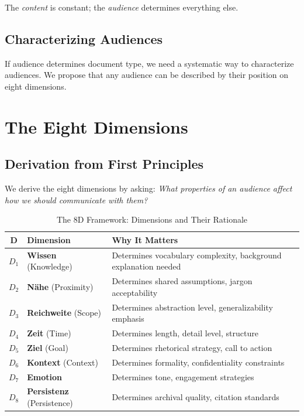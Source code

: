The \textit{content} is constant; the \textit{audience} determines everything else.

\subsection{Characterizing Audiences}

If audience determines document type, we need a systematic way to characterize
audiences. We propose that any audience can be described by their position
on eight dimensions.


\section{The Eight Dimensions}
\label{sec:doctype-theory-dimensions}

\subsection{Derivation from First Principles}

We derive the eight dimensions by asking: \textit{What properties of an audience
affect how we should communicate with them?}

\begin{table}[htbp]
\centering
\caption{The 8D Framework: Dimensions and Their Rationale}
\label{tab:8d-rationale}
\renewcommand{\arraystretch}{1.5}
\begin{tabular}{@{}clp{7cm}@{}}
\toprule
\textbf{D} & \textbf{Dimension} & \textbf{Why It Matters} \\
\midrule
$D_1$ & \textbf{Wissen} (Knowledge) &
Determines vocabulary complexity, background explanation needed \\
$D_2$ & \textbf{N\"ahe} (Proximity) &
Determines shared assumptions, jargon acceptability \\
$D_3$ & \textbf{Reichweite} (Scope) &
Determines abstraction level, generalizability emphasis \\
$D_4$ & \textbf{Zeit} (Time) &
Determines length, detail level, structure \\
$D_5$ & \textbf{Ziel} (Goal) &
Determines rhetorical strategy, call to action \\
$D_6$ & \textbf{Kontext} (Context) &
Determines formality, confidentiality constraints \\
$D_7$ & \textbf{Emotion} &
Determines tone, engagement strategies \\
$D_8$ & \textbf{Persistenz} (Persistence) &
Determines archival quality, citation standards \\
\bottomrule
\end{tabular}
\end{table}

